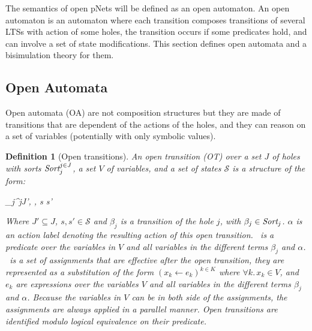\documentclass{lmcs}
\newcommand{\TODO}[1]{\textcolor{red}{\textbf{[TODO:#1]}}}
\newtheorem{definition}{Definition}
\begin{document}
The semantics of open pNets will be defined  as an open automaton. An open
automaton is an automaton where each transition composes transitions of several LTSs with
action of some holes, the transition occurs if some predicates hold, and can involve a 
set of state modifications. This section defines open automata and a bisimulation theory for them.

\subsection{Open Automata}
 Open automata (OA) are not composition structures but they are made of transitions that are dependent of the actions of the holes, and they can reason on a set of variables (potentially with only symbolic values). 
\begin{definition}[Open transitions]\label{def:OT}
	\label{def:OpenTransitions}
	An \emph{open transition} (OT) over a
	set $J$ of holes with sorts $\Sort_j^{j\in J}$, a set $V$ of variables, and a set of states $\mathcal{S}$ is 
	a structure of the form:	
	\begin{mathpar}
	\openrule
	{	\beta_j^{j\in J'}, \Pred, \Post}
	{s \OTarrow {\alpha}s'}
	\end{mathpar}
	Where $J'\subseteq J$, $s, s'\in\mathcal{S}$ and $\beta_j$
        is a transition of the hole $j$, with $\beta_j\in\Sort_j$. $\alpha$ is an action 
        label denoting the resulting action of this open transition.
        \Pred\ is a predicate over the  variables in $V$ and all variables
        in the different terms
       $\beta_j$ and $\alpha$. \Post\ is a set of 
	assignments that are effective \emph{after the open transition}, they are
        represented as a substitution of the form $({x_k\gets e_k})^{k\in K}$ 
	where $\forall k.\, x_k\in V$, and $e_k$ are expressions
        over the variables $V$ and all variables
        in the different terms
       $\beta_j$ and $\alpha$. Because the variables in $V$ can be in both side of the assignments, the assignments are always applied in a parallel manner. Open transitions are identified
        modulo logical equivalence on their predicate. 
\end{definition}
\end{document}
